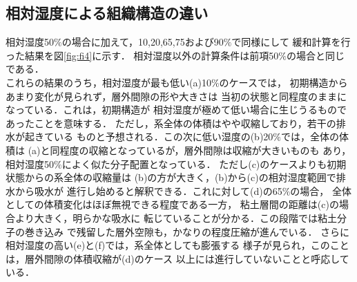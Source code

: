 \subsection{相対湿度による組織構造の違い}
相対湿度50$\%$の場合に加えて，10,20,65,75および90$\%$で同様にして
緩和計算を行った結果を図\ref{fig:fi4}に示す．
相対湿度以外の計算条件は前項50$\%$の場合と同じである．\\
これらの結果のうち，相対湿度が最も低い(a)10$\%$のケースでは，
初期構造からあまり変化が見られず，層外間隙の形や大きさは
当初の状態と同程度のままになっている．これは，初期構造が
相対湿度が極めて低い場合に生じうるものであったことを意味する．
ただし，系全体の体積はやや収縮しており，若干の排水が起きている
ものと予想される．この次に低い湿度の(b)20$\%$では，全体の体積は
(a)と同程度の収縮となっているが，層外間隙は収縮が大きいものも
あり，相対湿度50$\%$によく似た分子配置となっている．
ただし(c)のケースよりも初期状態からの系全体の収縮量は
(b)の方が大きく，(b)から(c)の相対湿度範囲で排水から吸水が
進行し始めると解釈できる．これに対して(d)の65$\%$の場合，
全体としての体積変化はほぼ無視できる程度である一方，
粘土層間の距離は(c)の場合より大きく，明らかな吸水に
転じていることが分かる．この段階では粘土分子の巻き込み
で残留した層外空隙も，かなりの程度圧縮が進んでいる．
さらに相対湿度の高い(e)と(f)では，系全体としても膨張する
様子が見られ，このことは，層外間隙の体積収縮が(d)のケース
以上には進行していないことと呼応している．\\
